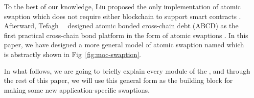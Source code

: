 \label{sec:swaption}
To the best of our knowledge, Liu proposed the only implementation of atomic swaption which does not require either blockchain to support smart contracts \cite{liu2018atomic}. Afterward, Tefagh~\etal~ designed atomic bonded cross-chain debt (ABCD) as the first practical cross-chain bond platform in the form of atomic swaptions \cite{tefagh2020atomic}. In this paper, we have designed a more general model of atomic swaption named \emph{\MetaSwaption} which is abstractly shown in Fig~\ref{fig:moc-swaption}.

In what follows, we are going to briefly explain every module of the \MetaSwaption, and through the rest of this paper, we will use this general form as the building block for making some new application-specific swaptions.

\begin{figure}
    \centering

\end{figure}
